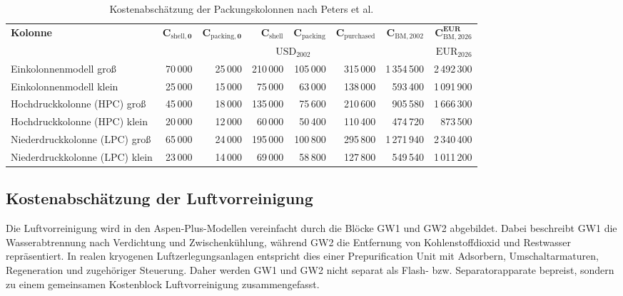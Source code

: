 \begin{table}[H]
\centering
\caption{Kostenabschätzung der Packungskolonnen nach Peters et al.}
\label{tab:kosten_kolonnen_gesamt}
\small
\begin{tabular}{lrrrrrrr}
\hline
\textbf{Kolonne} &
\(\boldsymbol{C_{\mathrm{shell},0}}\) &
\(\boldsymbol{C_{\mathrm{packing},0}}\) &
\(\boldsymbol{C_{\mathrm{shell}}}\) &
\(\boldsymbol{C_{\mathrm{packing}}}\) &
\(\boldsymbol{C_{\mathrm{purchased}}}\) &
\(\boldsymbol{C_{\mathrm{BM,2002}}}\) &
\(\boldsymbol{C_{\mathrm{BM,2026}}^{EUR}}\) \\
&
\multicolumn{6}{c}{\(\mathrm{USD}_{2002}\)} &
\(\mathrm{EUR}_{2026}\) \\
\hline
Einkolonnenmodell groß & 70\,000 & 25\,000 & 210\,000 & 105\,000 & 315\,000 & 1\,354\,500 & 2\,492\,300 \\
Einkolonnenmodell klein & 25\,000 & 15\,000 & 75\,000 & 63\,000 & 138\,000 & 593\,400 & 1\,091\,900 \\
Hochdruckkolonne (HPC) groß & 45\,000 & 18\,000 & 135\,000 & 75\,600 & 210\,600 & 905\,580 & 1\,666\,300 \\
Hochdruckkolonne (HPC) klein & 20\,000 & 12\,000 & 60\,000 & 50\,400 & 110\,400 & 474\,720 & 873\,500 \\
Niederdruckkolonne (LPC) groß & 65\,000 & 24\,000 & 195\,000 & 100\,800 & 295\,800 & 1\,271\,940 & 2\,340\,400 \\
Niederdruckkolonne (LPC) klein & 23\,000 & 14\,000 & 69\,000 & 58\,800 & 127\,800 & 549\,540 & 1\,011\,200 \\
\hline
\end{tabular}
\end{table}


\subsection*{Kostenabschätzung der Luftvorreinigung}

Die Luftvorreinigung wird in den Aspen-Plus-Modellen vereinfacht durch die Blöcke
GW1 und GW2 abgebildet. Dabei beschreibt GW1 die Wasserabtrennung nach
Verdichtung und Zwischenkühlung, während GW2 die Entfernung von Kohlenstoffdioxid
und Restwasser repräsentiert. In realen kryogenen Luftzerlegungsanlagen entspricht
dies einer Prepurification Unit mit Adsorbern, Umschaltarmaturen, Regeneration
und zugehöriger Steuerung. Daher werden GW1 und GW2 nicht separat als
Flash- bzw. Separatorapparate bepreist, sondern zu einem gemeinsamen Kostenblock
Luftvorreinigung zusammengefasst.

